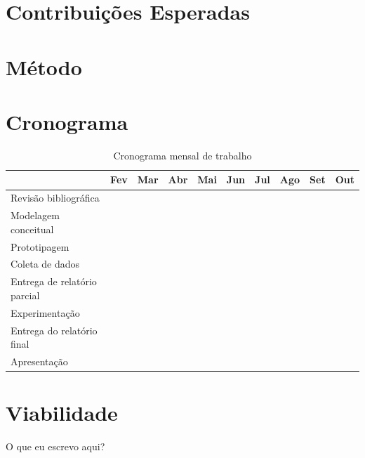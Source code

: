 \documentclass[pfc]{imetex}
\begin{document}
\section{Contribuições Esperadas}

\section{Método}



\section{Cronograma}

\begin{table}[htb]
\begin{tabular}{|l|c|c|c|c|c|c|c|c|c|}
\hline
& Fev & Mar & Abr & Mai & Jun & Jul & Ago & Set & Out \\
\hline
Revisão bibliográfica &
\multicolumn{2}{c}{\cellcolor[gray]{0.5}} &
\multicolumn{6}{c}{} &
\\
\hline
Modelagem conceitual &
\multicolumn{1}{c}{} &
\multicolumn{3}{c}{\cellcolor[gray]{0.5}} &
\multicolumn{4}{c}{} &
\\
\hline
Prototipagem &
\multicolumn{2}{c}{} &
\multicolumn{3}{c}{\cellcolor[gray]{0.5}} &
\multicolumn{3}{c}{} &
\\
\hline
Coleta de dados &
\multicolumn{4}{c}{} &
\multicolumn{1}{c}{\cellcolor[gray]{0.5}} &
\multicolumn{3}{c}{} &
\\
\hline
Entrega de relatório parcial &
\multicolumn{3}{c}{} &
\multicolumn{1}{c}{\cellcolor[gray]{0.5}} &
\multicolumn{1}{c}{} &
\multicolumn{1}{c}{\cellcolor[gray]{0.5}} &
\multicolumn{2}{c}{} &
\\
\hline
Experimentação &
\multicolumn{5}{c}{} &
\multicolumn{2}{c}{\cellcolor[gray]{0.5}} &
\multicolumn{1}{c}{} &
\\
\hline
Entrega do relatório final &
\multicolumn{7}{c}{} &
\multicolumn{1}{c}{\cellcolor[gray]{0.5}} &
\\
\hline
Apresentação &
\multicolumn{8}{c}{} &
\multicolumn{1}{c}{\cellcolor[gray]{0.5}}
\\
\hline
\end{tabular}

\caption{Cronograma mensal de trabalho}
\end{table}

\section{Viabilidade}
O que eu escrevo aqui?
\end{document}

